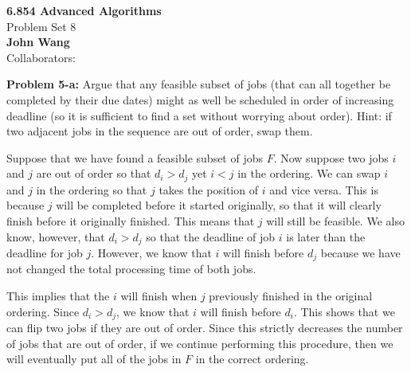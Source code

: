 \documentclass[psamsfonts]{amsart}
\newenvironment{sol}{\vspace{0.25cm}{\large \bfseries Solution:}}{\qedsymbol}
\newenvironment{prob}[1]{\begin{framed}{\large \bfseries Problem #1:}}{\end{framed}}
\newcommand{\makenewtitle}{
    \begin{center}
    {\huge \bfseries 6.854 Advanced Algorithms} \\
    Problem Set 8\\
    \vspace{0.25cm}
    {\bfseries John Wang} \\
    Collaborators:  
    \end{center}
    \vspace{0.5cm}
}
\begin{document}
\newpage
\makenewtitle

\begin{prob}{5-a}
Argue that any feasible subset of jobs (that can all together be completed by their due dates) might as well be scheduled in order of increasing deadline (so it is sufficient to find a set without worrying about order). Hint: if two adjacent jobs in the sequence are out of order, swap them. 
\end{prob}
\begin{sol}
Suppose that we have found a feasible subset of jobs $F$. Now suppose two jobs $i$ and $j$ are out of order so that $d_i > d_j$ yet $i < j$ in the ordering. We can swap $i$ and $j$ in the ordering so that $j$ takes the position of $i$ and vice versa. This is because $j$ will be completed before it started originally, so that it will clearly finish before it originally finished. This means that $j$ will still be feasible. We also know, however, that $d_i > d_j$ so that the deadline of job $i$ is later than the deadline for job $j$. However, we know that $i$ will finish before $d_j$ because we have not changed the total processing time of both jobs. 

This implies that the $i$ will finish when $j$ previously finished in the original ordering. Since $d_i > d_j$, we know that $i$ will finish before $d_i$. This shows that we can flip two jobs if they are out of order. Since this strictly decreases the number of jobs that are out of order, if we continue performing this procedure, then we will eventually put all of the jobs in $F$ in the correct ordering. 
\end{sol}
\end{document}
